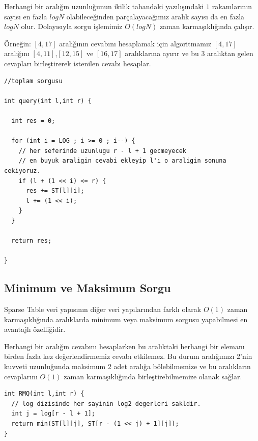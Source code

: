 \documentclass[12pt]{article}
\begin{document}
    Herhangi bir aral{\i}\u{g}{\i}n uzunlu\u{g}unun ikilik tabandaki yaz{\i}l{\i}\c{s}{\i}ndaki $1$ rakamlar{\i}n{\i}n say{\i}s{\i} en fazla $logN$ olabilece\u{g}inden par\c{c}alayaca\u{g}{\i}m{\i}z aral{\i}k say{\i}s{\i} da en fazla $logN$ olur. Dolay{\i}s{\i}yla sorgu i\c{s}lemimiz $O(logN)$ zaman karma\c{s}{\i}kl{\i}\u{g}{\i}nda \c{c}al{\i}\c{s}{\i}r. 
    
    \"{O}rne\u{g}in: $[4,17]$ aral{\i}\u{g}{\i}n{\i}n cevab{\i}n{\i} hesaplamak i\c{c}in algoritmam{\i}z $[4,17]$ aral{\i}\u{g}{\i}n{\i} $[4,11]$,$[12,15]$ ve $[16,17]$ aral{\i}klar{\i}na ay{\i}r{\i}r ve bu $3$ aral{\i}ktan gelen cevaplar{\i} birle\c{s}tirerek istenilen cevab{\i} hesaplar.
    
    \begin{verbatim}
//toplam sorgusu

int query(int l,int r) {

  int res = 0;

  for (int i = LOG ; i >= 0 ; i--) {
    // her seferinde uzunlugu r - l + 1 gecmeyecek
    // en buyuk araligin cevabi ekleyip l'i o araligin sonuna cekiyoruz.
    if (l + (1 << i) <= r) {
      res += ST[l][i];
      l += (1 << i);
    }
  }

  return res;

}
    \end{verbatim}    

    \subsection{Minimum ve Maksimum Sorgu}
    
    Sparse Table veri yap{\i}s{\i}n{\i}n di\u{g}er veri yap{\i}lar{\i}ndan farkl{\i} olarak $O(1)$ zaman karma\c{s}{\i}kl{\i}\u{g}{\i}nda aral{\i}klarda  minimum veya maksimum sorgusu yapabilmesi en avantajl{\i} \"{o}zelli\u{g}idir.

    Herhangi bir aral{\i}\u{g}{\i}n cevab{\i}n{\i} hesaplarken bu aral{\i}ktaki herhangi bir eleman{\i} birden fazla kez de\u{g}erlendirmemiz cevab{\i} etkilemez. Bu durum aral{\i}\u{g}{\i}m{\i}z{\i} 2'nin kuvveti uzunlu\u{g}unda maksimum 2 adet aral{\i}\u{g}a b\"{o}lebilmemize ve bu aral{\i}klar{\i}n cevaplar{\i}n{\i} $O(1)$ zaman karma\c{s}{\i}kl{\i}\u{g}{\i}nda birle\c{s}tirebilmemize olanak sa\u{g}lar.
    
    \begin{verbatim}
int RMQ(int l,int r) {
  // log dizisinde her sayinin log2 degerleri sakldir.
  int j = log[r - l + 1];
  return min(ST[l][j], ST[r - (1 << j) + 1][j]);  
}
    \end{verbatim}
    
\end{document}
